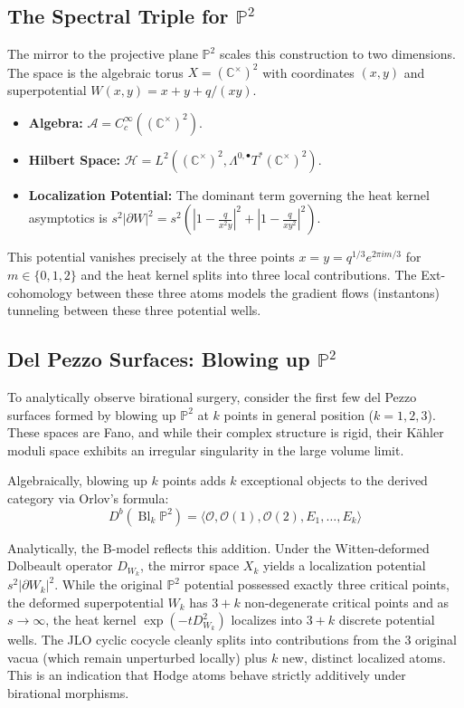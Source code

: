 \documentclass[12pt,reqno]{amsart}
\theoremstyle{remark} \newtheorem{remark}[theorem]{Remark}
\begin{document}
\subsection{The Spectral Triple for $\mathbb{P}^2$}
The mirror to the projective plane $\mathbb{P}^2$ scales this
construction to two dimensions. The space is the algebraic torus $X =
(\mathbb{C}^\times)^2$ with coordinates $(x,y)$ and superpotential
$W(x,y) = x + y + q/(xy)$.
\begin{itemize}
    \item \textbf{Algebra:} $\mathcal{A} =
      C_c^\infty((\mathbb{C}^\times)^2)$.
    \item \textbf{Hilbert Space:} $\mathcal{H} =
      L^2((\mathbb{C}^\times)^2, \Lambda^{0,\bullet} T^*
      (\mathbb{C}^\times)^2)$.
    \item \textbf{Localization Potential:} The dominant term governing
      the heat kernel asymptotics is $s^2 |\partial W|^2 = s^2 \left(
      \left| 1 - \frac{q}{x^2y} \right|^2 + \left| 1 - \frac{q}{xy^2}
      \right|^2 \right)$.
\end{itemize}
This potential vanishes precisely at the three points $x = y = q^{1/3}
e^{2\pi i m / 3}$ for $m \in \{0, 1, 2\}$ and the heat kernel splits into
three local contributions. The Ext-cohomology between these three
atoms models the gradient flows (instantons) tunneling
between these three potential wells.

\subsection{Del Pezzo Surfaces: Blowing up $\mathbb{P}^2$}
To analytically observe birational surgery, consider the first few del Pezzo
surfaces formed by blowing up $\mathbb{P}^2$ at $k$ points in general
position ($k=1, 2, 3$). These spaces are Fano, and while their complex
structure is rigid, their K\"ahler moduli space exhibits an irregular
singularity in the large volume limit.

Algebraically, blowing up $k$ points adds $k$ exceptional objects to
the derived category via Orlov's formula:
\begin{equation}
    D^b(\operatorname{Bl}_k \mathbb{P}^2) = \langle \mathcal{O},
    \mathcal{O}(1), \mathcal{O}(2), E_1, \dots, E_k \rangle
\end{equation}

Analytically, the B-model reflects this addition. Under the
Witten-deformed Dolbeault operator $D_{W_k}$, the mirror space $X_k$
yields a localization potential $s^2 |\partial W_k|^2$. While the
original $\mathbb{P}^2$ potential possessed exactly three critical points,
the deformed superpotential $W_k$ has $3 + k$
non-degenerate critical points and as $s \to \infty$, the heat kernel $\exp(-t D_{W_k}^2)$ localizes into
$3+k$ discrete potential wells. The JLO cyclic cocycle cleanly splits
into contributions from the 3 original vacua (which remain unperturbed
locally) plus $k$ new, distinct localized atoms. This is an indication
that Hodge atoms behave strictly additively under birational morphisms.
\end{document}
